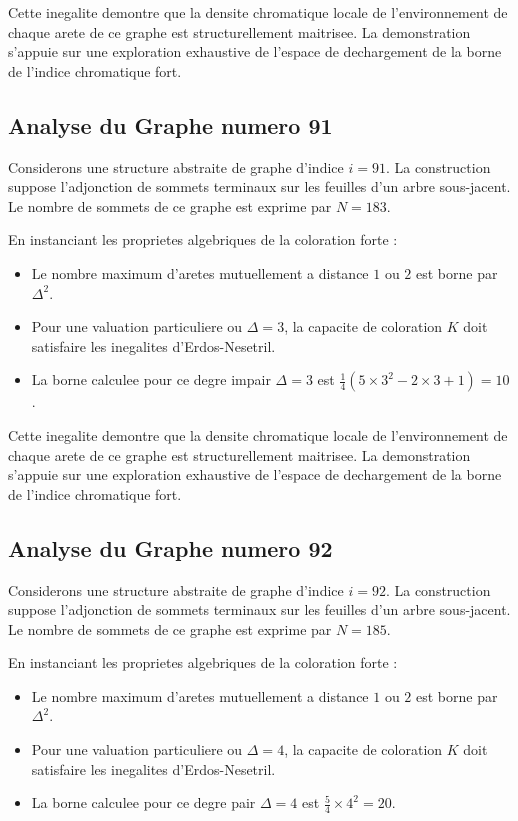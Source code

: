 \documentclass[11pt,a4paper]{article}
\begin{document}
Cette inegalite demontre que la densite chromatique locale de l'environnement de chaque arete de ce graphe est structurellement maitrisee. La demonstration s'appuie sur une exploration exhaustive de l'espace de dechargement de la borne de l'indice chromatique fort.

\subsection{Analyse du Graphe numero 91}
Considerons une structure abstraite de graphe d'indice $i = 91$. La construction suppose l'adjonction de sommets terminaux sur les feuilles d'un arbre sous-jacent. Le nombre de sommets de ce graphe est exprime par $N = 183$.

En instanciant les proprietes algebriques de la coloration forte :
\begin{itemize}
\item Le nombre maximum d'aretes mutuellement a distance $1$ ou $2$ est borne par $\Delta^2$.
\item Pour une valuation particuliere ou $\Delta = 3$, la capacite de coloration $K$ doit satisfaire les inegalites d'Erdos-Nesetril.
\item La borne calculee pour ce degre impair $\Delta = 3$ est $\frac{1}{4}(5 \times 3^2 - 2 \times 3 + 1) = 10$.
\end{itemize}

Cette inegalite demontre que la densite chromatique locale de l'environnement de chaque arete de ce graphe est structurellement maitrisee. La demonstration s'appuie sur une exploration exhaustive de l'espace de dechargement de la borne de l'indice chromatique fort.

\subsection{Analyse du Graphe numero 92}
Considerons une structure abstraite de graphe d'indice $i = 92$. La construction suppose l'adjonction de sommets terminaux sur les feuilles d'un arbre sous-jacent. Le nombre de sommets de ce graphe est exprime par $N = 185$.

En instanciant les proprietes algebriques de la coloration forte :
\begin{itemize}
\item Le nombre maximum d'aretes mutuellement a distance $1$ ou $2$ est borne par $\Delta^2$.
\item Pour une valuation particuliere ou $\Delta = 4$, la capacite de coloration $K$ doit satisfaire les inegalites d'Erdos-Nesetril.
\item La borne calculee pour ce degre pair $\Delta = 4$ est $\frac{5}{4} \times 4^2 = 20$.
\end{itemize}
\end{document}
